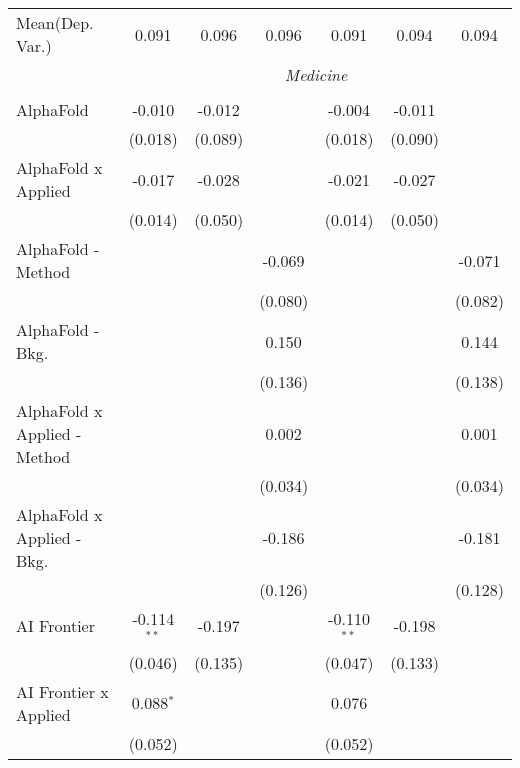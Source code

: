 \begin{tabular}{lcccccc}
Mean(Dep. Var.) & 0.091 & 0.096 & 0.096 & 0.091 & 0.094 & 0.094 \\
 & \multicolumn{6}{c}{\textit{Medicine}} \\ \\
   AlphaFold                    & -0.010        & -0.012  &              & -0.004        & -0.011      &   \\   
                                & (0.018)       & (0.089) &              & (0.018)       & (0.090)     &   \\   
   AlphaFold x Applied          & -0.017        & -0.028  &              & -0.021        & -0.027      &   \\   
                                & (0.014)       & (0.050) &              & (0.014)       & (0.050)     &   \\   
   AlphaFold - Method           &               &         & -0.069       &               &             & -0.071\\   
                                &               &         & (0.080)      &               &             & (0.082)\\   
   AlphaFold - Bkg.             &               &         & 0.150        &               &             & 0.144\\   
                                &               &         & (0.136)      &               &             & (0.138)\\   
   AlphaFold x Applied - Method &               &         & 0.002        &               &             & 0.001\\   
                                &               &         & (0.034)      &               &             & (0.034)\\   
   AlphaFold x Applied - Bkg.   &               &         & -0.186       &               &             & -0.181\\   
                                &               &         & (0.126)      &               &             & (0.128)\\   
   AI Frontier                  & -0.114$^{**}$ & -0.197  &              & -0.110$^{**}$ & -0.198      &   \\   
                                & (0.046)       & (0.135) &              & (0.047)       & (0.133)     &   \\   
   AI Frontier x Applied        & 0.088$^{*}$   &         &              & 0.076         &             &   \\   
                                & (0.052)       &         &              & (0.052)       &             &   \\   

\end{tabular}
